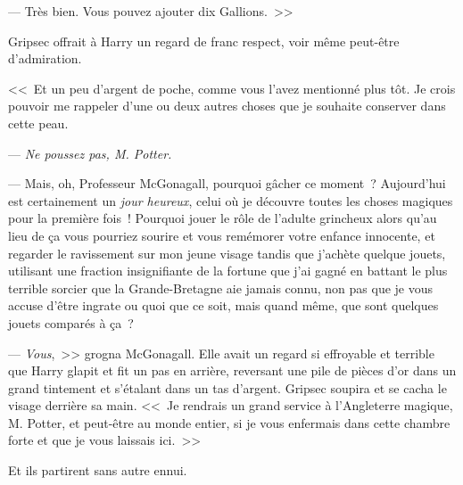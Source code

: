 --- Très bien. Vous pouvez ajouter dix Gallions.~>>

Gripsec offrait à Harry un regard de franc respect, voir même peut-être d'admiration.

<<~Et un peu d'argent de poche, comme vous l'avez mentionné plus tôt. Je crois pouvoir me rappeler d'une ou deux autres choses que je souhaite conserver dans cette peau.

--- \emph{Ne poussez pas, M. Potter.}

--- Mais, oh, Professeur McGonagall, pourquoi gâcher ce moment~? Aujourd'hui est certainement un \emph{jour heureux}, celui où je découvre toutes les choses magiques pour la première fois~! Pourquoi jouer le rôle de l'adulte grincheux alors qu'au lieu de ça vous pourriez sourire et vous remémorer votre enfance innocente, et regarder le ravissement sur mon jeune visage tandis que j'achète quelque jouets, utilisant une fraction insignifiante de la fortune que j'ai gagné en battant le plus terrible sorcier que la Grande-Bretagne aie jamais connu, non pas que je vous accuse d'être ingrate ou quoi que ce soit, mais quand même, que sont quelques jouets comparés à ça~?

--- \emph{Vous},~>> grogna McGonagall. Elle avait un regard si effroyable et terrible que Harry glapit et fit un pas en arrière, reversant une pile de pièces d'or dans un grand tintement et s'étalant dans un tas d'argent. Gripsec soupira et se cacha le visage derrière sa main. <<~Je rendrais un grand service à l'Angleterre magique, M. Potter, et peut-être au monde entier, si je vous enfermais dans cette chambre forte et que je vous laissais ici.~>>

Et ils partirent sans autre ennui.

